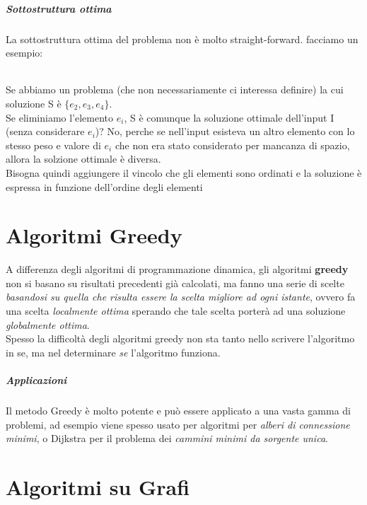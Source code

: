 \documentclass[12pt, a4paper, openany]{book}
\begin{document}
\paragraph{Sottostruttura ottima}
La sottostruttura ottima del problema non è molto straight-forward. facciamo un esempio:
\subparagraph*{}Se abbiamo un problema (che non necessariamente ci interessa definire) la cui soluzione S è $\{e_2,e_3,e_4\}$.\\
Se eliminiamo l'elemento $e_i$, S è comunque la soluzione ottimale dell'input I (senza considerare $e_i$)? No, perche se nell'input esisteva un altro elemento con lo stesso peso e valore di $e_i$ che non era stato considerato per mancanza di spazio, allora la solzione ottimale è diversa.
\\Bisogna quindi aggiungere il vincolo che gli elementi sono ordinati e la soluzione è espressa in funzione dell'ordine degli elementi 

\chapter{Algoritmi Greedy}
A differenza degli algoritmi di programmazione dinamica, gli algoritmi \textbf{greedy} non si basano su risultati precedenti già calcolati, ma fanno una serie di scelte \emph{basandosi su quella che risulta essere la scelta migliore ad ogni istante}, ovvero fa una scelta \emph{localmente ottima} sperando che tale scelta porterà ad una soluzione \emph{globalmente ottima}.
\\Spesso la difficoltà degli algoritmi greedy non sta tanto nello scrivere l'algoritmo in se, ma nel determinare \emph{se} l'algoritmo funziona. 
\paragraph{Applicazioni}
Il metodo Greedy è molto potente e può essere applicato a una vasta gamma di problemi, ad esempio viene spesso usato per algoritmi per \emph{alberi di connessione minimi}, o Dijkstra per il problema dei \emph{cammini minimi da sorgente unica}.

\chapter{Algoritmi su Grafi}
\end{document}
